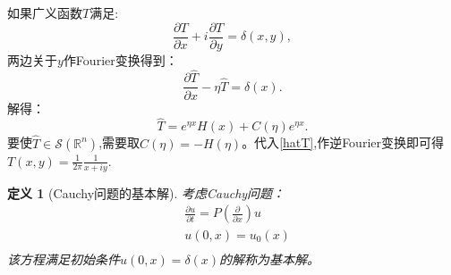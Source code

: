 \documentclass[a4paper]{ctexart}
\newtheorem{Definition}{\hspace{2em}定义}[section]
\newcommand{\Rn}{\mathbb{R}^{n}}
\newcommand{\pdfFrac}[2]{\frac{\partial #1}{\partial #2}}
\begin{document}
如果广义函数$T$满足:
\begin{equation}
    \pdfFrac{T}{x}+i\pdfFrac{T}{y}=\delta(x,y),
\end{equation}
两边关于$y$作Fourier变换得到：
\begin{equation}
    \pdfFrac{\hat{T}}{x}-\eta\hat{T}=\delta(x).
\end{equation}
解得：
\begin{equation}
    \label{hatT}
    \hat{T}=e^{\eta x}H(x)+C(\eta)e^{\eta x}.
\end{equation}
要使$\hat{T}\in\mathscr{S}(\Rn)$,需要取$C(\eta)=-H(\eta)$。代入\eqref{hatT},作逆Fourier变换即可得$T(x,y)=\frac{1}{2\pi}\frac{1}{x+iy}$.
\begin{Definition}[Cauchy问题的基本解]
    考虑Cauchy问题：
    \begin{equation}
        \begin{aligned}
            &\pdfFrac{u}{t}=P(\pdfFrac{}{x})u\\
            &u(0,x)=u_{0}(x)\\
        \end{aligned}
    \end{equation}
    该方程满足初始条件$u(0,x)=\delta(x)$的解称为基本解。
\end{Definition}
\end{document}
